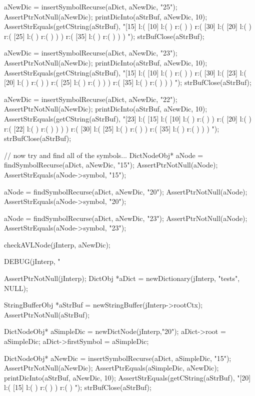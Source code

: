   aNewDic = insertSymbolRecurse(aDict, aNewDic, "25");
  AssertPtrNotNull(aNewDic);
  printDicInto(aStrBuf, aNewDic, 10);
  AssertStrEquals(getCString(aStrBuf),
  "[15] l:( [10] l:(  ) r:(  )  ) r:( [30] l:( [20] l:(  ) r:( [25] l:(  ) r:(  )  )  ) r:( [35] l:(  ) r:(  )  )  ) ");
  strBufClose(aStrBuf);

  aNewDic = insertSymbolRecurse(aDict, aNewDic, "23");
  AssertPtrNotNull(aNewDic);
  printDicInto(aStrBuf, aNewDic, 10);
  AssertStrEquals(getCString(aStrBuf),
  "[15] l:( [10] l:(  ) r:(  )  ) r:( [30] l:( [23] l:( [20] l:(  ) r:(  )  ) r:( [25] l:(  ) r:(  )  )  ) r:( [35] l:(  ) r:(  )  )  ) ");
  strBufClose(aStrBuf);
  
  aNewDic = insertSymbolRecurse(aDict, aNewDic, "22");
  AssertPtrNotNull(aNewDic);
  printDicInto(aStrBuf, aNewDic, 10);
  AssertStrEquals(getCString(aStrBuf),
  "[23] l:( [15] l:( [10] l:(  ) r:(  )  ) r:( [20] l:(  ) r:( [22] l:(  ) r:(  )  )  )  ) r:( [30] l:( [25] l:(  ) r:(  )  ) r:( [35] l:(  ) r:(  )  )  ) ");
  strBufClose(aStrBuf);
  
  // now try and find all of the symbols...
  DictNodeObj* aNode = findSymbolRecurse(aDict, aNewDic, "15");
  AssertPtrNotNull(aNode);
  AssertStrEquals(aNode->symbol, "15");

  aNode = findSymbolRecurse(aDict, aNewDic, "20");
  AssertPtrNotNull(aNode);
  AssertStrEquals(aNode->symbol, "20");

  aNode = findSymbolRecurse(aDict, aNewDic, "23");
  AssertPtrNotNull(aNode);
  AssertStrEquals(aNode->symbol, "23");

  checkAVLNode(jInterp, aNewDic);
\stopCTest
\stopTestCase


\startCTest
  DEBUG(jInterp, "\n%

  AssertPtrNotNull(jInterp);
  DictObj *aDict = newDictionary(jInterp, "tests", NULL);

  StringBufferObj *aStrBuf = newStringBuffer(jInterp->rootCtx);
  AssertPtrNotNull(aStrBuf);
  
  DictNodeObj* aSimpleDic = newDictNode(jInterp,"20");
  aDict->root             = aSimpleDic;
  aDict->firstSymbol      = aSimpleDic;

  DictNodeObj* aNewDic = insertSymbolRecurse(aDict, aSimpleDic, "15");
  AssertPtrNotNull(aNewDic);
  AssertPtrEquals(aSimpleDic, aNewDic);
  printDicInto(aStrBuf, aNewDic, 10);
  AssertStrEquals(getCString(aStrBuf),
  "[20] l:( [15] l:(  ) r:(  )  ) r:(  ) ");
  strBufClose(aStrBuf);
  
